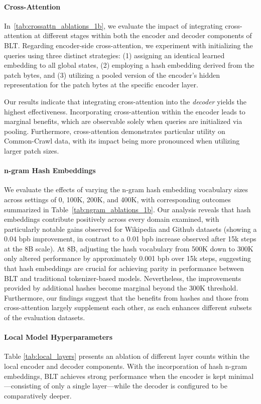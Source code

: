 \paragraph{Cross-Attention} 
In~\autoref{tab:crossattn_ablations_1b}, we evaluate the impact of integrating cross-attention at different stages within both the encoder and decoder components of {\textsc BLT}. Regarding encoder-side cross-attention, we experiment with initializing the queries using three distinct strategies: (1) assigning an identical learned embedding to all global states, (2) employing a hash embedding derived from the patch bytes, and (3) utilizing a pooled version of the encoder’s hidden representation for the patch bytes at the specific encoder layer.

Our results indicate that integrating cross-attention into the \textit{decoder} yields the highest effectiveness. Incorporating cross-attention within the encoder leads to marginal benefits, which are observable solely when queries are initialized via pooling. Furthermore, cross-attention demonstrates particular utility on Common-Crawl data, with its impact being more pronounced when utilizing larger patch sizes.

\paragraph{n-gram Hash Embeddings} 

We evaluate the effects of varying the n-gram hash embedding vocabulary sizes across settings of 0, 100K, 200K, and 400K, with corresponding outcomes summarized in Table~\ref{tab:ngram_ablations_1b}. Our analysis reveals that hash embeddings contribute positively across every domain examined, with particularly notable gains observed for Wikipedia and Github datasets (showing a 0.04 bpb improvement, in contrast to a 0.01 bpb increase observed after 15k steps at the 8B scale). At 8B, adjusting the hash vocabulary from 500K down to 300K only altered performance by approximately 0.001 bpb over 15k steps, suggesting that hash embeddings are crucial for achieving parity in performance between {\textsc BLT} and traditional tokenizer-based models. Nevertheless, the improvements provided by additional hashes become marginal beyond the 300K threshold. Furthermore, our findings suggest that the benefits from hashes and those from cross-attention largely supplement each other, as each enhances different subsets of the evaluation datasets.

\paragraph{Local Model Hyperparameters} Table \ref{tab:local_layers} presents an ablation of different layer counts within the local encoder and decoder components. With the incorporation of hash n-gram embeddings, {\textsc BLT} achieves strong performance when the encoder is kept minimal—consisting of only a single layer—while the decoder is configured to be comparatively deeper.

